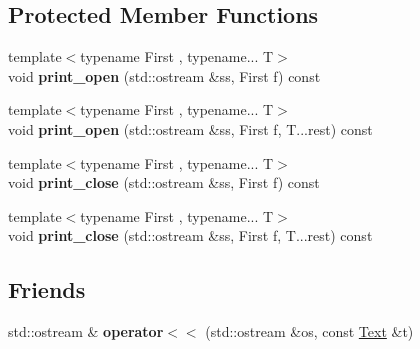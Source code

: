\subsection*{\-Protected \-Member \-Functions}
\begin{DoxyCompactItemize}
\item 
\hypertarget{classlatex_1_1Text_a0698c08485898d3d3a1515b6df2b9899}{{\footnotesize template$<$typename First , typename... \-T$>$ }\\void {\bfseries print\-\_\-open} (std\-::ostream \&ss, \-First f) const }\label{classlatex_1_1Text_a0698c08485898d3d3a1515b6df2b9899}

\item 
\hypertarget{classlatex_1_1Text_a30409704fa5fbf24ad67a6ccc74e9a62}{{\footnotesize template$<$typename First , typename... \-T$>$ }\\void {\bfseries print\-\_\-open} (std\-::ostream \&ss, \-First f, \-T...\-rest) const }\label{classlatex_1_1Text_a30409704fa5fbf24ad67a6ccc74e9a62}

\item 
\hypertarget{classlatex_1_1Text_a87ffdecea2103f1fb0a1ad5a4d9d790a}{{\footnotesize template$<$typename First , typename... \-T$>$ }\\void {\bfseries print\-\_\-close} (std\-::ostream \&ss, \-First f) const }\label{classlatex_1_1Text_a87ffdecea2103f1fb0a1ad5a4d9d790a}

\item 
\hypertarget{classlatex_1_1Text_aab9338b600852c1f5113239f50bb031b}{{\footnotesize template$<$typename First , typename... \-T$>$ }\\void {\bfseries print\-\_\-close} (std\-::ostream \&ss, \-First f, \-T...\-rest) const }\label{classlatex_1_1Text_aab9338b600852c1f5113239f50bb031b}

\end{DoxyCompactItemize}
\subsection*{\-Friends}
\begin{DoxyCompactItemize}
\item 
\hypertarget{classlatex_1_1Text_a38c082a0cd5fe7844698b04bc1bbb31f}{std\-::ostream \& {\bfseries operator$<$$<$} (std\-::ostream \&os, const \hyperlink{classlatex_1_1Text}{\-Text} \&t)}\label{classlatex_1_1Text_a38c082a0cd5fe7844698b04bc1bbb31f}

\end{DoxyCompactItemize}


